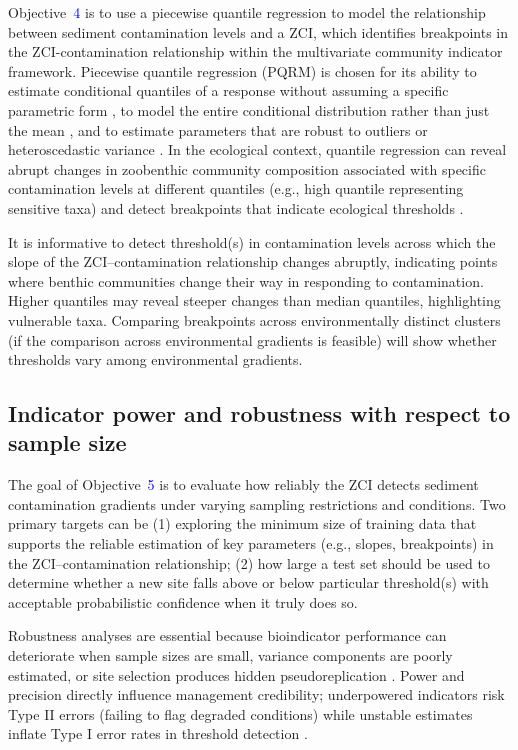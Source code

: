 Objective~\textcolor{blue}{4} is to use a piecewise quantile regression to model the relationship 
between sediment contamination levels and a ZCI,
which identifies breakpoints in the ZCI-contamination relationship within the multivariate community indicator framework. 
Piecewise quantile regression (PQRM) is chosen for its ability to estimate conditional quantiles 
of a response without assuming a specific parametric form \cite{Cade2003,Huang2017}, 
to model the entire conditional distribution rather than just the mean \cite{Cade2003},
and to estimate parameters that are robust to outliers or heteroscedastic variance \cite{Huang2017}.
In the ecological context, quantile regression can reveal abrupt changes in zoobenthic community 
composition associated with specific contamination levels at different quantiles 
(e.g., high quantile representing sensitive taxa)
and detect breakpoints that indicate ecological thresholds \cite{Jabed2020,Spake2022,Daily2012}.

It is informative to detect threshold(s) in contamination levels across which the slope of the ZCI–contamination relationship 
changes abruptly, indicating points where benthic communities change their way in responding to contamination. 
Higher quantiles may reveal steeper changes than median quantiles, highlighting vulnerable taxa. 
Comparing breakpoints across environmentally distinct clusters (if the comparison across environmental gradients is feasible)
will show whether thresholds vary among environmental gradients.


\subsection{Indicator power and robustness with respect to sample size}
The goal of Objective~\textcolor{blue}{5} is to evaluate how reliably
the ZCI detects sediment contamination gradients under varying sampling restrictions and conditions.
Two primary targets can be (1) exploring the minimum size of training data that supports the reliable estimation 
of key parameters (e.g., slopes, breakpoints)\cite{Spake2022} in the ZCI–contamination relationship; 
(2) how large a test set should be used to determine whether a new site falls above or below 
particular threshold(s) with acceptable probabilistic confidence when it truly does so.


Robustness analyses are essential because bioindicator performance can deteriorate when sample sizes are small, variance components are poorly estimated, or site selection produces hidden pseudoreplication \cite{Hurlbert1984Pseudo}. Power and precision directly influence management credibility; underpowered indicators risk Type II errors (failing to flag degraded conditions) while unstable estimates inflate Type I error rates in threshold detection \cite{Osenberg1994ImpactPower,Fairweather1991MonitoringPower}.

